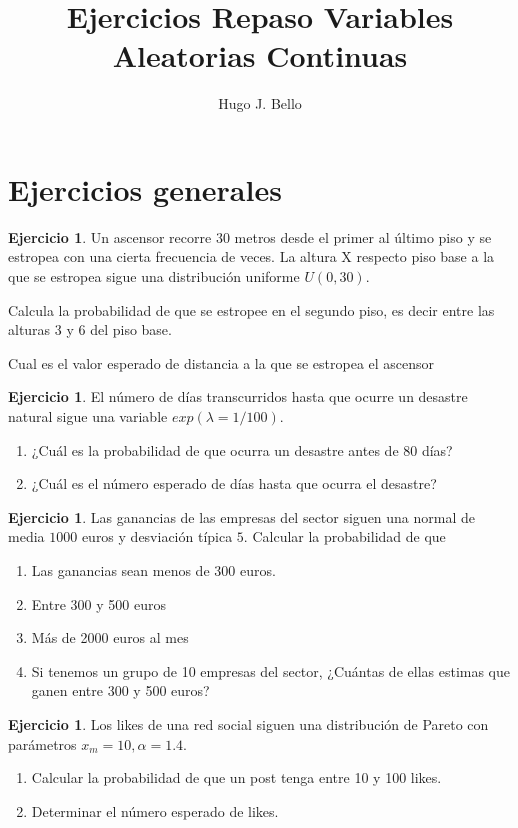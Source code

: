 \documentclass[]{article}
\title{Ejercicios Repaso Variables Aleatorias Continuas}
\author{Hugo J. Bello}
\date{}
\theoremstyle{plain}
\theoremstyle{definition}
\newtheorem{exercise}[theorem]{Ejercicio}
\theoremstyle{definition} %
\begin{document}
\maketitle
\section{Ejercicios generales}



\begin{exercise}
  Un ascensor recorre 30 metros desde el primer al último piso y se estropea con una cierta 
  frecuencia de veces. La altura X respecto piso base a la que se estropea sigue una distribución 
  uniforme $U(0,30)$.

  Calcula la probabilidad de que se estropee en el segundo piso, es decir entre las alturas 3 y 6 del piso base.

  Cual es el valor esperado de distancia a la que se estropea el ascensor

  \end{exercise}



\begin{exercise}
  El número de días transcurridos hasta que ocurre un desastre natural sigue una variable
  $exp(\lambda= 1/100)$. 
  \begin{enumerate}
    \item ¿Cuál es la probabilidad de que ocurra un desastre antes de 80 días?
    \item ¿Cuál es el número esperado de días hasta que ocurra el desastre?
  \end{enumerate}
\end{exercise}
 
\begin{exercise}
  Las ganancias de las empresas del sector siguen una normal de media $1000$ euros y desviación típica $5$. Calcular la probabilidad de que 
  \begin{enumerate}
    \item Las ganancias sean menos de 300 euros.
    \item Entre 300 y 500 euros
    \item Más de 2000 euros al mes
    \item Si tenemos un grupo de 10 empresas del sector, ¿Cuántas de ellas estimas que ganen entre 300 y 500 euros?
  \end{enumerate}

\end{exercise}

\begin{exercise}
  Los likes de una red social siguen una distribución de Pareto 
  con parámetros $x_m = 10, \alpha = 1.4$. 
  \begin{enumerate}
    \item Calcular la probabilidad de que un post tenga  entre 10 y 100 likes.
    \item Determinar el número esperado de likes.
  \end{enumerate}
\end{exercise}
\end{document}
